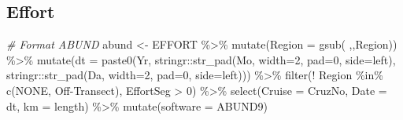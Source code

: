 \documentclass[
]{book}
\newenvironment{Shaded}{\begin{snugshade}}{\end{snugshade}}
\newcommand{\AttributeTok}[1]{\textcolor[rgb]{0.77,0.63,0.00}{#1}}
\newcommand{\CommentTok}[1]{\textcolor[rgb]{0.56,0.35,0.01}{\textit{#1}}}
\newcommand{\DecValTok}[1]{\textcolor[rgb]{0.00,0.00,0.81}{#1}}
\newcommand{\FunctionTok}[1]{\textcolor[rgb]{0.00,0.00,0.00}{#1}}
\newcommand{\NormalTok}[1]{#1}
\newcommand{\OtherTok}[1]{\textcolor[rgb]{0.56,0.35,0.01}{#1}}
\newcommand{\SpecialCharTok}[1]{\textcolor[rgb]{0.00,0.00,0.00}{#1}}
\newcommand{\StringTok}[1]{\textcolor[rgb]{0.31,0.60,0.02}{#1}}
\begin{document}
\hypertarget{effort}{%
\subsection*{Effort}\label{effort}}

\begin{Shaded}
\begin{Highlighting}[]
\CommentTok{\# Format ABUND}
\NormalTok{abund }\OtherTok{\textless{}{-}} 
\NormalTok{  EFFORT }\SpecialCharTok{\%\textgreater{}\%} 
  \FunctionTok{mutate}\NormalTok{(}\AttributeTok{Region =} \FunctionTok{gsub}\NormalTok{(}\StringTok{\textquotesingle{} \textquotesingle{}}\NormalTok{,}\StringTok{\textquotesingle{}\textquotesingle{}}\NormalTok{,Region)) }\SpecialCharTok{\%\textgreater{}\%}
  \FunctionTok{mutate}\NormalTok{(}\AttributeTok{dt =} \FunctionTok{paste0}\NormalTok{(Yr,}
\NormalTok{                     stringr}\SpecialCharTok{::}\FunctionTok{str\_pad}\NormalTok{(Mo, }\AttributeTok{width=}\DecValTok{2}\NormalTok{, }\AttributeTok{pad=}\StringTok{\textquotesingle{}0\textquotesingle{}}\NormalTok{, }\AttributeTok{side=}\StringTok{\textquotesingle{}left\textquotesingle{}}\NormalTok{),}
\NormalTok{                     stringr}\SpecialCharTok{::}\FunctionTok{str\_pad}\NormalTok{(Da, }\AttributeTok{width=}\DecValTok{2}\NormalTok{, }\AttributeTok{pad=}\StringTok{\textquotesingle{}0\textquotesingle{}}\NormalTok{, }\AttributeTok{side=}\StringTok{\textquotesingle{}left\textquotesingle{}}\NormalTok{))) }\SpecialCharTok{\%\textgreater{}\%} 
  \FunctionTok{filter}\NormalTok{(}\SpecialCharTok{!}\NormalTok{ Region }\SpecialCharTok{\%in\%} \FunctionTok{c}\NormalTok{(}\StringTok{\textquotesingle{}NONE\textquotesingle{}}\NormalTok{, }\StringTok{\textquotesingle{}Off{-}Transect\textquotesingle{}}\NormalTok{),}
\NormalTok{         EffortSeg }\SpecialCharTok{\textgreater{}} \DecValTok{0}\NormalTok{) }\SpecialCharTok{\%\textgreater{}\%} 
  \FunctionTok{select}\NormalTok{(}\AttributeTok{Cruise =}\NormalTok{ CruzNo, }\AttributeTok{Date =}\NormalTok{ dt, }\AttributeTok{km =}\NormalTok{ length) }\SpecialCharTok{\%\textgreater{}\%} 
  \FunctionTok{mutate}\NormalTok{(}\AttributeTok{software =} \StringTok{\textquotesingle{}ABUND9\textquotesingle{}}\NormalTok{)}
  

\end{Highlighting}
\end{Shaded}
\end{document}
